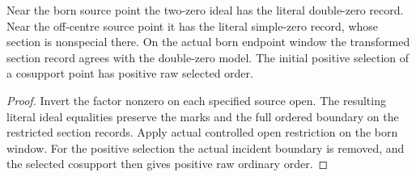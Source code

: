 \begin{theorem}
\label{hir:g1-two-zero-actual-source-charts}
\leanok
Near the born source point the two-zero ideal has the literal
double-zero record. Near the off-centre source point it has the
literal simple-zero record, whose section is nonspecial there.
On the actual born endpoint window the transformed section
record agrees with the double-zero model. The initial positive
selection of a cosupport point has positive raw selected order.
\end{theorem}
\begin{proof}
Invert the factor nonzero on each specified source open.
The resulting literal ideal equalities preserve the marks and
the full ordered boundary on the restricted section records.
Apply actual controlled open restriction on the born window.
For the positive selection the actual incident boundary is
removed, and the selected cosupport then gives positive raw
ordinary order.
\end{proof}

